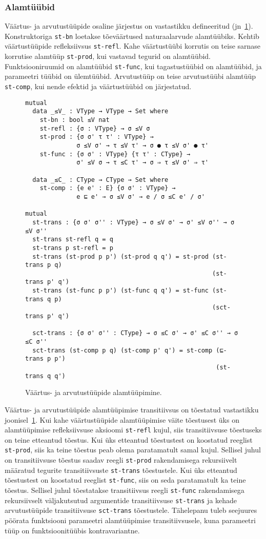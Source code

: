 \documentclass[a4paper,12pt]{article}
\begin{document}
\subsubsection{Alamtüübid}\label{ssec:exc.subtypes}
Väärtus- ja arvutustüüpide osaline järjestus on vastastikku defineeritud (jn~\ref{fig:exc.subtypes}).
Konstruktoriga {\tt st-bn} loetakse tõeväärtused naturaalarvude alamtüübiks.
Kehtib väärtustüüpide refleksiivsus {\tt st-refl}.
Kahe väärtustüübi korrutis on teise sarnase korrutise alamtüüp {\tt st-prod}, kui vastavad tegurid on alamtüübid.
Funktsiooniruumid on alamtüübid {\tt st-func}, kui tagastustüübid on alamtüübid,
ja parameetri tüübid on ülemtüübid.
Arvutustüüp on teise arvutustüübi alamtüüp {\tt st-comp}, kui nende efektid ja väärtustüübid on järjestatud.
\begin{figure}
  \begin{BVerbatim}
mutual
  data _≤V_ : VType → VType → Set where
    st-bn : bool ≤V nat
    st-refl : {σ : VType} → σ ≤V σ
    st-prod : {σ σ' τ τ' : VType} →
              σ ≤V σ' → τ ≤V τ' → σ ● τ ≤V σ' ● τ'
    st-func : {σ σ' : VType} {τ τ' : CType} →
              σ' ≤V σ → τ ≤C τ' → σ ⇒ τ ≤V σ' ⇒ τ'

  data _≤C_ : CType → CType → Set where
    st-comp : {e e' : E} {σ σ' : VType} →
              e ⊑ e' → σ ≤V σ' → e / σ ≤C e' / σ'

mutual
  st-trans : {σ σ' σ'' : VType} → σ ≤V σ' → σ' ≤V σ'' → σ ≤V σ''
  st-trans st-refl q = q
  st-trans p st-refl = p
  st-trans (st-prod p p') (st-prod q q') = st-prod (st-trans p q)
                                                   (st-trans p' q')
  st-trans (st-func p p') (st-func q q') = st-func (st-trans q p)
                                                   (sct-trans p' q')

  sct-trans : {σ σ' σ'' : CType} → σ ≤C σ' → σ' ≤C σ'' → σ ≤C σ''
  sct-trans (st-comp p q) (st-comp p' q') = st-comp (⊑-trans p p')
                                                    (st-trans q q')
  \end{BVerbatim}
  \caption{Väärtus- ja arvutustüüpide alamtüüpimine.}
  \label{fig:exc.subtypes}
\end{figure}

Väärtus- ja arvutustüüpide alamtüüpimise transitiivsus on tõestatud vastastikku joonisel~\ref{fig:exc.subtypes}.
Kui kahe väärtustüüpide alamtüüpimise väite tõestusest üks on alamtüüpimise refleksiivsuse aksioomi {\tt st-refl} kujul, siis transitiivsuse tõestuseks on teine etteantud tõestus.
Kui üks etteantud tõestustest on koostatud reeglist {\tt st-prod},
siis ka teine tõestus peab olema paratamatult samal kujul.
Sellisel juhul on transitiivsuse tõestus saadav reegli {\tt st-prod} rakendamisega rekursiivelt määratud tegurite transitiivsuste {\tt st-trans} tõestustele.
Kui üks etteantud tõestustest on koostatud reeglist {\tt st-func},
siis on seda paratamatult ka teine tõestus.
Sellisel juhul tõestatakse transitiivsus reegli {\tt st-func} rakendamisega rekursiivselt väljakutsutud argumentide transitiivsuse {\tt st-trans} ja kehade arvutustüüpide transitiivsuse {\tt sct-trans} tõestustele.
Tähelepanu tuleb seejuures pöörata funktsiooni parameetri alamtüüpimise transitiivsusele, kuna parameetri tüüp on funktsioonitüübis kontravariantne.
\end{document}
